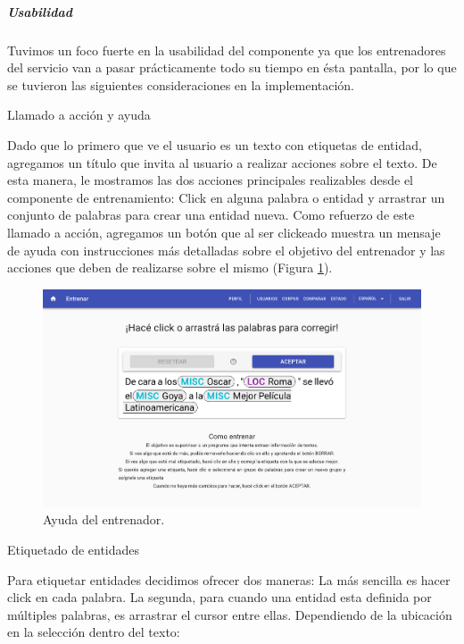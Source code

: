 \documentclass[12pt,a4paper,]{scrartcl}
\let\oldsubparagraph\subparagraph
\renewcommand{\subparagraph}[1]{\oldsubparagraph{#1}\mbox{}}
\begin{document}
\hypertarget{usabilidad}{%
\subparagraph{Usabilidad}\label{usabilidad}}

Tuvimos un foco fuerte en la usabilidad del componente ya que los entrenadores del servicio van a pasar prácticamente todo su tiempo en ésta pantalla, por lo que se tuvieron las siguientes consideraciones en la implementación.

Llamado a acción y ayuda

Dado que lo primero que ve el usuario es un texto con etiquetas de entidad, agregamos un título que invita al usuario a realizar acciones sobre el texto. De esta manera, le mostramos las dos acciones principales realizables desde el componente de entrenamiento: Click en alguna palabra o entidad y arrastrar un conjunto de palabras para crear una entidad nueva.
Como refuerzo de este llamado a acción, agregamos un botón que al ser clickeado muestra un mensaje de ayuda con instrucciones más detalladas sobre el objetivo del entrenador y las acciones que deben de realizarse sobre el mismo (Figura \ref{fig:logic-train-help}).

\begin{figure}[H]

{\centering \includegraphics{assets/logic/train-help.pdf} 

}

\caption{Ayuda del entrenador.}\label{fig:logic-train-help}
\end{figure}

Etiquetado de entidades

Para etiquetar entidades decidimos ofrecer dos maneras: La más sencilla es hacer click en cada palabra. La segunda, para cuando una entidad esta definida por múltiples palabras, es arrastrar el cursor entre ellas.
Dependiendo de la ubicación en la selección dentro del texto:
\end{document}
